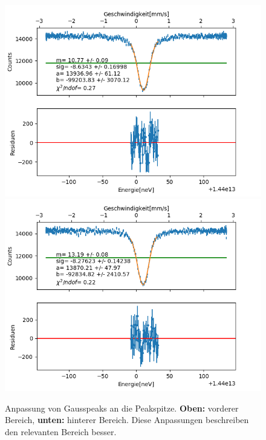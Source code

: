 \documentclass[12pt,a4paper]{article}
\begin{document}
\begin{figure}
\centering
\includegraphics[scale=0.8]{Bilder/Einlinien/Ein_halbgauss_vor.png}
\includegraphics[scale=0.8]{Bilder/Einlinien/Ein_halbgauss_nach.png}
\caption{Anpassung von Gausspeaks an die Peakspitze. \textbf{Oben:} vorderer Bereich, \textbf{unten:} hinterer Bereich. Diese Anpassungen beschreiben den relevanten Bereich besser.}
\label{fig:Ein_halbgauss}
\end{figure}
\end{document}
